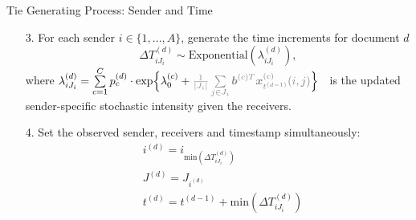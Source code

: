 \documentclass[10pt]{beamer}
\theoremstyle{definition}
\theoremstyle{remark}
\begin{document}
\begin{frame}{Tie Generating Process: Sender and Time}
\begin{itemize}
		\item [3.] For each sender $i \in \{1,...,A\}$, generate the time increments for document $d$
		\begin{equation*}
		\Delta T^{(d)}_{i{J_i}} \sim \mbox{Exponential}(\lambda_{i{J_i}}^{(d)}),
		\end{equation*}\normalsize
		where \footnotesize$\lambda^{(d)}_{iJ_i}= \sum\limits_{c=1}^{C} p^{(d)}_c\cdot\mbox{exp}\Big\{\lambda^{(c)}_0+\textcolor{gray}{\frac{1}{|J_i|}\sum\limits_{j \in J_i} \boldsymbol{b}^{(c)T}\boldsymbol{x}^{(c)}_{t^{(d-1)}}(i, j)}\Big\}\quad$\normalsize is the updated sender-specific stochastic intensity given the receivers.\vspace{0.4cm}
		\item[4.] Set the observed sender, receivers and timestamp simultaneously:
			\begin{equation*}
		\begin{aligned}
		&i^{(d)} = i_{\mbox{min}(\Delta T^{(d)}_{i{J_i}})} \\
		&J^{(d)} = J_{i^{(d)}}\\
		&t^{(d)} = t^{(d-1)}+\mbox{min}(\Delta T^{(d)}_{i{J_i}})\\
		\end{aligned}
		\end{equation*}
		\normalsize
\end{itemize}
\end{frame}
\end{document}
